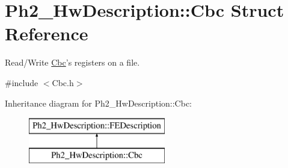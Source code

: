 \hypertarget{class_ph2___hw_description_1_1_cbc}{\section{Ph2\-\_\-\-Hw\-Description\-:\-:Cbc Struct Reference}
\label{class_ph2___hw_description_1_1_cbc}
}


Read/\-Write \hyperlink{class_ph2___hw_description_1_1_cbc}{Cbc}'s registers on a file.  




{\ttfamily \#include $<$Cbc.\-h$>$}

Inheritance diagram for Ph2\-\_\-\-Hw\-Description\-:\-:Cbc\-:\begin{figure}[H]
\begin{center}
\leavevmode
\includegraphics[height=2.000000cm]{class_ph2___hw_description_1_1_cbc}
\end{center}
\end{figure}
